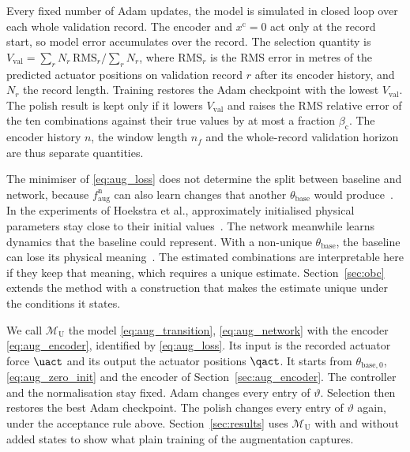 Every fixed number of Adam updates, the model is simulated in closed loop over
each whole validation record.
The encoder and $x^{\mathrm c}=0$ act only at the record start, so model error
accumulates over the record.
The selection quantity is
$V_{\mathrm{val}}=\sum_rN_r\,\mathrm{RMS}_r/\sum_rN_r$, where $\mathrm{RMS}_r$
is the RMS error in metres of the predicted actuator positions on validation
record $r$ after its encoder history, and $N_r$ the record length.
Training restores the Adam checkpoint with the lowest $V_{\mathrm{val}}$.
The polish result is kept only if it lowers $V_{\mathrm{val}}$ and raises the
RMS relative error of the ten combinations against their true values by at
most a fraction $\beta_{\mathrm c}$.
The encoder history $n$, the window length $n_f$ and the whole-record
validation horizon are thus separate quantities.

The minimiser of \eqref{eq:aug_loss} does not determine the split between
baseline and network, because $f^{\mathrm n}_{\mathrm{aug}}$ can also learn
changes that another $\theta_{\mathrm{base}}$ would
produce~\cite[Sec.~5.2]{hoekstra2026lfr}.
In the experiments of Hoekstra et al., approximately initialised physical
parameters stay close to their initial values~\cite[Sec.~6.3]{hoekstra2026lfr}.
The network meanwhile learns dynamics that the baseline could represent.
With a non-unique $\theta_{\mathrm{base}}$, the baseline can lose its physical
meaning~\cite[Sec.~3]{gyorok2026obc}.
The estimated combinations are interpretable here if they keep that meaning,
which requires a unique estimate.
Section~\ref{sec:obc} extends the method with a construction that makes the
estimate unique under the conditions it states.

We call $\mathcal M_{\mathrm U}$ the model \eqref{eq:aug_transition},
\eqref{eq:aug_network} with the encoder \eqref{eq:aug_encoder}, identified by
\eqref{eq:aug_loss}.
Its input is the recorded actuator force $\uact$ and its output the actuator
positions $\qact$.
It starts from $\theta_{\mathrm{base},0}$, \eqref{eq:aug_zero_init} and the
encoder of Section~\ref{sec:aug_encoder}.
The controller and the normalisation stay fixed.
Adam changes every entry of $\vartheta$.
Selection then restores the best Adam checkpoint.
The polish changes every entry of $\vartheta$ again, under the acceptance rule
above.
Section~\ref{sec:results} uses $\mathcal M_{\mathrm U}$ with and without added
states to show what plain training of the augmentation captures.

